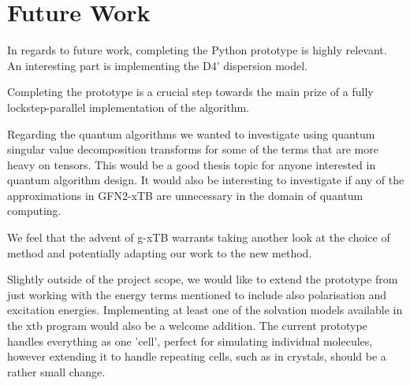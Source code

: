 \chapter{Future Work}\label{sec:future}
In regards to future work, completing the Python prototype is highly relevant. 
An interesting part is implementing the D4' dispersion model. 

Completing the prototype is a crucial step towards the main prize of a fully lockstep-parallel implementation of the algorithm. 

Regarding the quantum algorithms we wanted to investigate using quantum singular value decomposition transforms for some of the terms that are more heavy on tensors. This would be a good thesis topic for anyone interested in quantum algorithm design. It would also be interesting to investigate if any of the approximations in GFN2-xTB are unnecessary in the domain of quantum computing.

We feel that the advent of g-xTB warrants taking another look at the choice of method and potentially adapting our work to the new method. 

Slightly outside of the project scope, we would like to extend the prototype from just working with the energy terms mentioned to include also polarisation and excitation energies. Implementing at least one of the solvation models available in the xtb program would also be a welcome addition. The current prototype handles everything as one 'cell', perfect for simulating individual molecules, however extending it to handle repeating cells, such as in crystals, should be a rather small change. 
